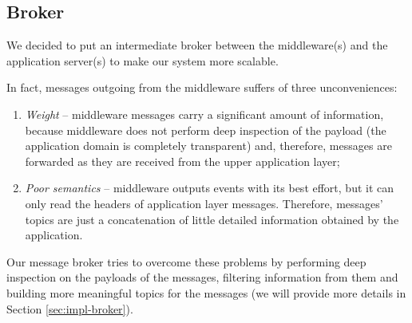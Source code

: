 \subsection{Broker}

We decided to put an intermediate broker between the middleware(s) and the
application server(s) to make our system more scalable.

In fact, messages outgoing from the middleware suffers of three unconveniences:

\begin{enumerate}
  \item \textit{Weight} -- middleware messages carry a significant amount of
    information, because middleware does not perform deep inspection of the
    payload (the application domain is completely transparent) and, therefore,
    messages are forwarded as they are received from the upper application
    layer;
  \item \textit{Poor semantics} -- middleware outputs events with its best
    effort, but it can only read the headers of application layer messages.
    Therefore, messages' topics are just a concatenation of little detailed
    information obtained by the application.
\end{enumerate}

Our message broker tries to overcome these problems by performing deep
inspection on the payloads of the messages, filtering information from them and
building more meaningful topics for the messages (we will provide more details
in Section \ref{sec:impl-broker}).
